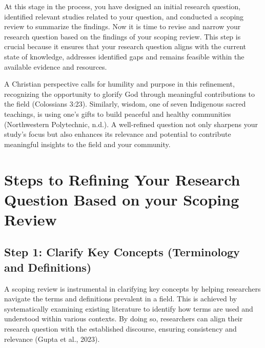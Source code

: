 \documentclass[
  letterpaper,
  DIV=11,
  numbers=noendperiod]{scrreprt}
\begin{document}
At this stage in the process, you have designed an initial research
question, identified relevant studies related to your question, and
conducted a scoping review to summarize the findings. Now it is time to
revise and narrow your research question based on the findings of your
scoping review. This step is crucial because it ensures that your
research question aligns with the current state of knowledge, addresses
identified gaps and remains feasible within the available evidence and
resources.

A Christian perspective calls for humility and purpose in this
refinement, recognizing the opportunity to glorify God through
meaningful contributions to the field (Colossians 3:23). Similarly,
wisdom, one of seven Indigenous sacred teachings, is using one's gifts
to build peaceful and healthy communities (Northwestern Polytechnic,
n.d.). A well-refined question not only sharpens your study's focus but
also enhances its relevance and potential to contribute meaningful
insights to the field and your community.


\chapter*{Steps to Refining Your Research Question Based on your Scoping
Review}\label{steps-to-refining-your-research-question-based-on-your-scoping-review}


\section*{Step 1: Clarify Key Concepts (Terminology and
Definitions)}\label{step-1-clarify-key-concepts-terminology-and-definitions}


A scoping review is instrumental in clarifying key concepts by helping
researchers navigate the terms and definitions prevalent in a field.
This is achieved by systematically examining existing literature to
identify how terms are used and understood within various contexts. By
doing so, researchers can align their research question with the
established discourse, ensuring consistency and relevance (Gupta et al.,
2023).
\end{document}

